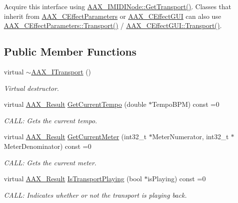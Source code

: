 Acquire this interface using \mbox{\hyperlink{a01845_a57bd132ee74047e25298b157c0bff2f9}{A\+A\+X\+\_\+\+I\+M\+I\+D\+I\+Node\+::\+Get\+Transport()}}. Classes that inherit from \mbox{\hyperlink{a01481}{A\+A\+X\+\_\+\+C\+Effect\+Parameters}} or \mbox{\hyperlink{a01477}{A\+A\+X\+\_\+\+C\+Effect\+G\+UI}} can also use \mbox{\hyperlink{a01481_af003e341f47eb1f170529db63066eca3}{A\+A\+X\+\_\+\+C\+Effect\+Parameters\+::\+Transport()}} / \mbox{\hyperlink{a01477_a5a034e713b03fb4591e45c2e7167189d}{A\+A\+X\+\_\+\+C\+Effect\+G\+U\+I\+::\+Transport()}}. \subsection*{Public Member Functions}
\begin{DoxyCompactItemize}
\item 
virtual \mbox{\hyperlink{a01885_a12f99a509f2a4b5e3ca0bfe9f850d0a9}{$\sim$\+A\+A\+X\+\_\+\+I\+Transport}} ()
\begin{DoxyCompactList}\small\item\em Virtual destructor. \end{DoxyCompactList}\item 
virtual \mbox{\hyperlink{a00392_a4d8f69a697df7f70c3a8e9b8ee130d2f}{A\+A\+X\+\_\+\+Result}} \mbox{\hyperlink{a01885_a006d7fdcc06c2c94209eeed846dfc068}{Get\+Current\+Tempo}} (double $\ast$Tempo\+B\+PM) const =0
\begin{DoxyCompactList}\small\item\em C\+A\+LL\+: Gets the current tempo. \end{DoxyCompactList}\item 
virtual \mbox{\hyperlink{a00392_a4d8f69a697df7f70c3a8e9b8ee130d2f}{A\+A\+X\+\_\+\+Result}} \mbox{\hyperlink{a01885_a211da0df922d70a9f5b85e7d596cc938}{Get\+Current\+Meter}} (int32\+\_\+t $\ast$Meter\+Numerator, int32\+\_\+t $\ast$Meter\+Denominator) const =0
\begin{DoxyCompactList}\small\item\em C\+A\+LL\+: Gets the current meter. \end{DoxyCompactList}\item 
virtual \mbox{\hyperlink{a00392_a4d8f69a697df7f70c3a8e9b8ee130d2f}{A\+A\+X\+\_\+\+Result}} \mbox{\hyperlink{a01885_a8f7d5b8f65ff9dd456a395838c974715}{Is\+Transport\+Playing}} (bool $\ast$is\+Playing) const =0
\begin{DoxyCompactList}\small\item\em C\+A\+LL\+: Indicates whether or not the transport is playing back. \end{DoxyCompactList}\item 

\end{DoxyCompactItemize}
